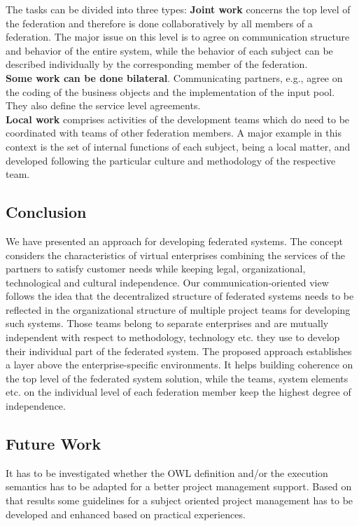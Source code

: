 The tasks can be divided into three types:
\textbf{Joint work} concerns the top level of the federation and therefore is done collaboratively by all members of a federation. The major issue on this level is to agree on communication structure and behavior of the entire system, while the behavior of each subject can be described individually by the corresponding member of the federation.\\
\textbf{Some work can be done bilateral}. Communicating partners, e.g., agree on the coding of the business objects and the implementation of the input pool. They also define the service level agreements.\\
\textbf{Local work} comprises activities of the development teams which do need to be coordinated with teams of other federation members. A major example in this context is the set of internal functions of each subject, being a local matter, and developed following the particular culture and methodology of the respective team.
\\


\subsection{Conclusion}
We have presented an approach for developing federated systems. The concept considers the characteristics of virtual enterprises combining the services of the partners to satisfy customer needs while keeping legal, organizational, technological and cultural independence.
Our communication-oriented view follows the idea that the decentralized structure of federated systems needs to be reflected in the organizational structure of multiple project teams for developing such systems. Those teams belong to separate enterprises and are mutually independent with respect to methodology, technology etc. they use to develop their individual part of the federated system. 
The proposed approach establishes a layer above the enterprise-specific environments. It helps building coherence on the top level of the federated system solution, while the teams, system elements etc. on the individual level of each federation member keep the highest degree of independence.

\subsection{Future Work}
It has to be investigated whether the OWL definition and/or the execution semantics has to be adapted for a better project management support. Based on that results some guidelines for a subject oriented project management has to be developed and enhanced based on practical experiences.


